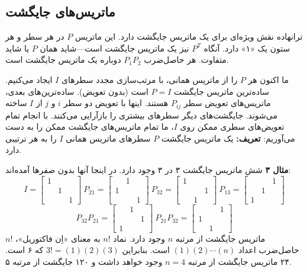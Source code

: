 \documentclass[12pt, a4paper]{book}
\begin{document}
	\subsection*{ماتریس‌های جایگشت}
	ترانهاده نقش ویژه‌ای برای یک ماتریس جایگشت دارد. این ماتریس $P$ در هر سطر و هر ستون یک «۱» دارد. آنگاه $P^T$ نیز یک ماتریس جایگشت است—شاید همان $P$ یا شاید متفاوت. هر حاصل‌ضرب $P_1P_2$ دوباره یک ماتریس جایگشت است.
	
	ما اکنون هر $P$ را از ماتریس همانی، با مرتب‌سازی مجدد سطرهای $I$ ایجاد می‌کنیم.
	ساده‌ترین ماتریس جایگشت $P=I$ است (بدون تعویض). ساده‌ترین‌های بعدی، ماتریس‌های تعویض سطر $P_{ij}$ هستند. اینها با تعویض دو سطر $i$ و $j$ از $I$ ساخته می‌شوند. جایگشت‌های دیگر سطرهای بیشتری را بازآرایی می‌کنند. با انجام تمام تعویض‌های سطری ممکن روی $I$، ما تمام ماتریس‌های جایگشت ممکن را به دست می‌آوریم:
	\textbf{تعریف:} یک ماتریس جایگشت $P$ سطرهای ماتریس همانی $I$ را به هر ترتیبی دارد.
	
	\textbf{مثال ۳} شش ماتریس جایگشت ۳ در ۳ وجود دارد. در اینجا آنها بدون صفرها آمده‌اند:
	\[ I = \begin{bmatrix} 1 & & \\ & 1 & \\ & & 1 \end{bmatrix} \ P_{21} = \begin{bmatrix} & 1 & \\ 1 & & \\ & & 1 \end{bmatrix} \ P_{32} = \begin{bmatrix} 1 & & \\ & & 1 \\ & 1 & \end{bmatrix} \ P_{13} = \begin{bmatrix} & & 1 \\ & 1 & \\ 1 & & \end{bmatrix} \]
	\[ P_{32}P_{21} = \begin{bmatrix} & 1 & \\ & & 1 \\ 1 & & \end{bmatrix} \ P_{21}P_{32} = \begin{bmatrix} & & 1 \\ 1 & & \\ & 1 & \end{bmatrix} \]
	$n!$ ماتریس جایگشت از مرتبه $n$ وجود دارد. نماد $n!$ به معنای «اِن فاکتوریل»، حاصل‌ضرب اعداد $(1)(2)\cdots(n)$ است. بنابراین $3!=(1)(2)(3)$ که ۶ است. ۲۴ ماتریس جایگشت از مرتبه $n=4$ وجود خواهد داشت و ۱۲۰ جایگشت از مرتبه ۵.
	
\end{document}
